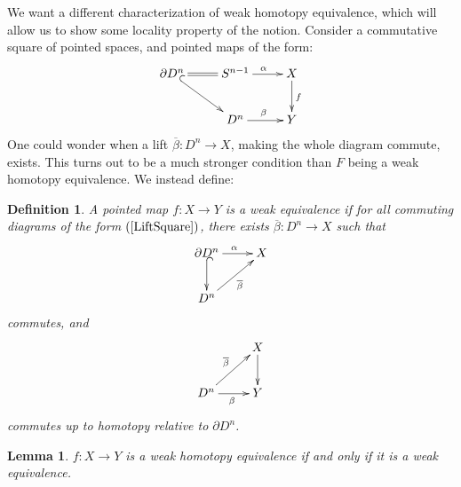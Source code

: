 \documentclass{article}
\newtheorem{lemma}[theorem]{Lemma}
\newtheorem{definition}[theorem]{Definition}
\newtheorem{proposed work}[theorem]{Proposed Work}
\newcommand{\xymat}[1]{\begin{align*}\xymatrix{ #1}\end{align*}}
\newcommand{\xymattal}[2]{\begin{align} \label{#1} \xymatrix{ #2}\end{align}}
\begin{document}
We want a different characterization of weak homotopy equivalence, which will allow us to show some locality property of the notion. Consider a commutative square of pointed spaces, and pointed maps of the form:  
\xymattal{LiftSquare}{\partial D^n \ar@{=}[r] \ar@{^{(}->}[dr]&S^{n-1} \ar[r]^\alpha  & X \ar[d]^f \\& D^n \ar[r]^\beta & Y}
One could wonder when a lift $\overline{\beta}: D^n \to X$, making the whole diagram commute, exists. This turns out to be a much stronger condition than $F$ being a weak homotopy equivalence. We instead define:
\begin{definition} \label{def:weak-equiv}
A pointed map $f:X\to Y$ is a weak equivalence if for all commuting diagrams of the form $(\ref{LiftSquare})$, there exists $\overline{\beta}:D^n\to X$ such that
\xymat{\partial D^n \ar[r]^\alpha \ar@{^{(}->}[d]& X \\ D^n \ar[ur]_{\overline{\beta}} &} commutes, and 
\xymat{& X \ar[d] \\ D^n \ar[ur]^{\overline{\beta}} \ar[r]_\beta & Y}
commutes up to homotopy relative to $\partial D^n$.
\end{definition}
\begin{lemma}
$f:X\to Y$ is a weak homotopy equivalence if and only if it is a weak equivalence.
\end{lemma}
\end{document}
